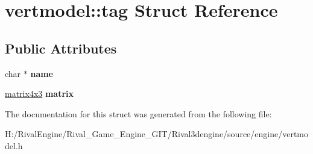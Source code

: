 \hypertarget{structvertmodel_1_1tag}{}\section{vertmodel\+:\+:tag Struct Reference}
\label{structvertmodel_1_1tag}
\subsection*{Public Attributes}
\begin{DoxyCompactItemize}
\item 
\mbox{\label{structvertmodel_1_1tag_a7d9ad8bf2ccb65ff245c8366c5f39256}} 
char $\ast$ {\bfseries name}
\item 
\mbox{\label{structvertmodel_1_1tag_a8f71dda5b4c3721aef4427488c728b3e}} 
\hyperlink{structmatrix4x3}{matrix4x3} {\bfseries matrix}
\end{DoxyCompactItemize}


The documentation for this struct was generated from the following file\+:\begin{DoxyCompactItemize}
\item 
H\+:/\+Rival\+Engine/\+Rival\+\_\+\+Game\+\_\+\+Engine\+\_\+\+G\+I\+T/\+Rival3dengine/source/engine/vertmodel.\+h\end{DoxyCompactItemize}

